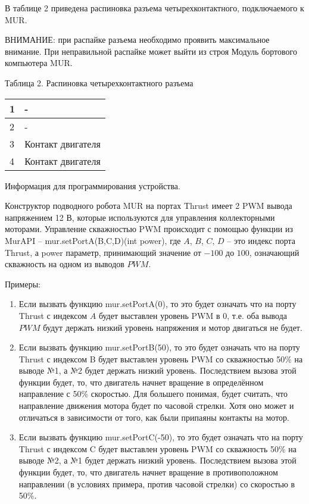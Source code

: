 В таблице 2 приведена распиновка разъема четырехконтактного, подключаемого к MUR. 

ВНИМАНИЕ: при распайке разъема необходимо проявить максимальное внимание. При неправильной распайке может выйти из строя Модуль бортового компьютера MUR.

\begin{table}[H]
    \center
    Таблица 2. Распиновка четырехконтактного разъема
    
    \begin{tabular}{|l|l|}
        \hline
        1 & - \\
        \hline
        2 & - \\
        \hline
        3 & Контакт двигателя \\
        \hline
        4 & Контакт двигателя \\
        \hline
    \end{tabular}
\end{table}

Информация для программирования устройства.

Конструктор подводного робота MUR на портах Thrust имеет 2 PWM вывода напряжением 12 В, которые используются для управления коллекторными моторами. Управление скважностью PWM происходит с помощью функции из MurAPI – mur.setPortA(B,C,D)(int power), где $A$, $B$, $C$, $D$ – это индекс порта Thrust, а power параметр, принимающий значение от $-100$ до $100$, означающий скважность на одном из выводов $PWM$.

Примеры:
\begin{enumerate}
    \item Если вызвать функцию mur.setPortA(0), то это будет означать что на порту Thrust с индексом $A$ будет выставлен уровень PWM в $0$, т.е. оба вывода $PWM$ будут держать низкий уровень напряжения и мотор двигаться не будет.
    \item Если вызвать функцию mur.setPortB(50), то это будет означать что на порту Thrust с индексом B будет выставлен уровень PWM со скважностью 50\% на выводе №1, а №2 будет держать низкий уровень. Последствием вызова этой функции будет, то, что двигатель начнет вращение в определённом направление с 50\% скоростью. Для большего понимая, будет считать, что направление движения мотора будет по часовой стрелки. Хотя оно может и отличаться в зависимости от того, как были припаяны контакты на мотор.
    \item Если вызвать функцию mur.setPortC(-50), то это будет означать что на порту Thrust с индексом C будет выставлен уровень PWM со скважность 50\% на выводе №2,  а №1 будет держать низкий уровень. Последствием вызова этой функции будет, то, что двигатель начнет вращение в противоположном направлении (в условиях примера, против часовой стрелки) со скоростью в 50\%.
\end{enumerate}

